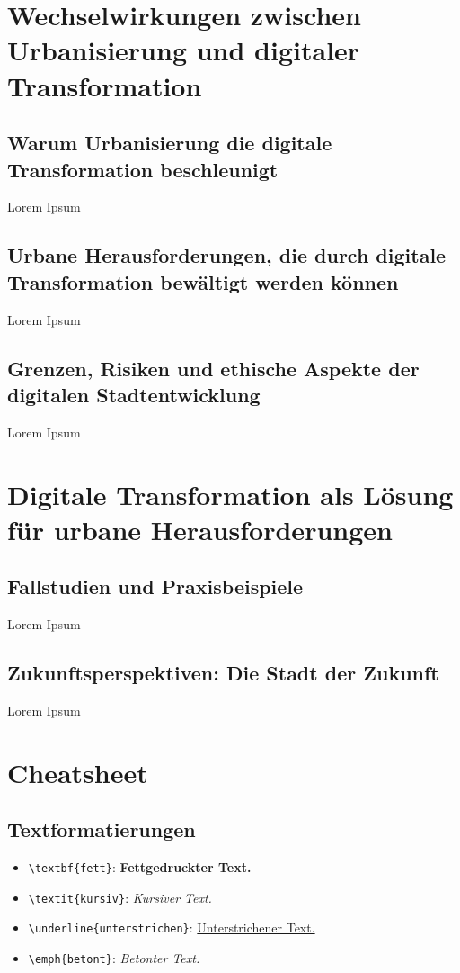 \documentclass[conference,compsoc,final,a4paper, onecolumn, 11pt]{IEEEtran}
\begin{document}
\section{Wechselwirkungen zwischen Urbanisierung und digitaler Transformation}
\subsection{Warum Urbanisierung die digitale Transformation beschleunigt}
Lorem Ipsum

\subsection{Urbane Herausforderungen, die durch digitale Transformation bewältigt werden können}
Lorem Ipsum

\subsection{Grenzen, Risiken und ethische Aspekte der digitalen Stadtentwicklung}
Lorem Ipsum


\section{Digitale Transformation als Lösung für urbane Herausforderungen}
\subsection{Fallstudien und Praxisbeispiele}
Lorem Ipsum

\subsection{Zukunftsperspektiven: Die Stadt der Zukunft}
Lorem Ipsum


\section{Cheatsheet}
\subsection{Textformatierungen}
\begin{itemize}
  \item \texttt{\textbackslash textbf\{fett\}}: \textbf{Fettgedruckter Text.}
  \item \texttt{\textbackslash textit\{kursiv\}}: \textit{Kursiver Text.}
  \item \texttt{\textbackslash underline\{unterstrichen\}}: \underline{Unterstrichener Text.}
  \item \texttt{\textbackslash emph\{betont\}}: \emph{Betonter Text.}
\end{itemize}
\end{document}

